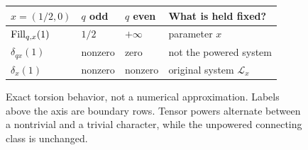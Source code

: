 \begin{figure}[tbp]
\centering
{}
\medskip
\begin{tabular}{@{}llll@{}}
\toprule
$x=(1/2,0)$ & $q$ odd & $q$ even & What is held fixed?\\\midrule
$\operatorname{Fill}_{q,x}(1)$ & $1/2$ & $+\infty$ & parameter $x$\\
$\delta_{qx}(1)$ & nonzero & zero & not the powered system\\
$\delta_x(1)$ & nonzero & nonzero & original system $\mathcal L_x$\\\bottomrule
\end{tabular}
\caption{Exact torsion behavior, not a numerical approximation. Labels
above the axis are boundary rows. Tensor powers alternate between a
nontrivial and a trivial character, while the unpowered connecting class
is unchanged.}
\label{fig:arithmetic-torsion}
\end{figure}